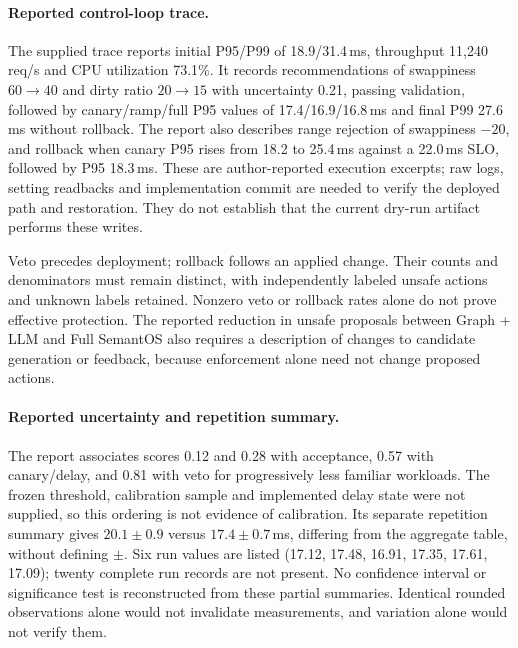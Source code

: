 \paragraph{Reported control-loop trace.}
The supplied trace reports initial P95/P99 of 18.9/31.4\,ms, throughput 11,240\,req/s and CPU utilization 73.1\%. It records recommendations of swappiness $60\to40$ and dirty ratio $20\to15$ with uncertainty 0.21, passing validation, followed by canary/ramp/full P95 values of 17.4/16.9/16.8\,ms and final P99 27.6\,ms without rollback. The report also describes range rejection of swappiness $-20$, and rollback when canary P95 rises from 18.2 to 25.4\,ms against a 22.0\,ms SLO, followed by P95 18.3\,ms. These are author-reported execution excerpts; raw logs, setting readbacks and implementation commit are needed to verify the deployed path and restoration. They do not establish that the current dry-run artifact performs these writes.

Veto precedes deployment; rollback follows an applied change. Their counts and denominators must remain distinct, with independently labeled unsafe actions and unknown labels retained. Nonzero veto or rollback rates alone do not prove effective protection. The reported reduction in unsafe proposals between Graph + LLM and Full SemantOS also requires a description of changes to candidate generation or feedback, because enforcement alone need not change proposed actions.

\paragraph{Reported uncertainty and repetition summary.}
The report associates scores 0.12 and 0.28 with acceptance, 0.57 with canary/delay, and 0.81 with veto for progressively less familiar workloads. The frozen threshold, calibration sample and implemented delay state were not supplied, so this ordering is not evidence of calibration. Its separate repetition summary gives $20.1\pm0.9$ versus $17.4\pm0.7$\,ms, differing from the aggregate table, without defining $\pm$. Six run values are listed (17.12, 17.48, 16.91, 17.35, 17.61, 17.09); twenty complete run records are not present. No confidence interval or significance test is reconstructed from these partial summaries. Identical rounded observations alone would not invalidate measurements, and variation alone would not verify them.


